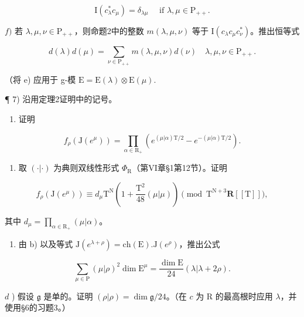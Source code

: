 \[
\mathrm{I} (c _ {\lambda} ^ {*} c _ {\mu}) = \delta_ {\lambda \mu} \quad \text { if } \lambda , \mu \in \mathrm{P} _ {+ +}.
\]

\(f)\) 若 \(\lambda, \mu, \nu \in \mathrm{P}_{++}\)，则命题2中的整数 \(m(\lambda, \mu, \nu)\) 等于 \(\mathrm{I}(c_{\lambda} c_{\mu} c_{\nu}^{*})\)。推出恒等式

\[
d (\lambda) d (\mu) = \sum_ {\nu \in \mathrm{P} _ {+ +}} m (\lambda , \mu , \nu) d (\nu) \quad \lambda , \mu , \nu \in \mathrm{P} _ {+ +}.
\]

（将 e) 应用于 g-模 \(\mathrm{E} = \mathrm{E}(\lambda) \otimes \mathrm{E}(\mu).\)

¶ 7) 沿用定理2证明中的记号。

\begin{enumerate}
\def\labelenumi{\alph{enumi})}
\tightlist
\item
  证明
\end{enumerate}

\[
f _ {\rho} (\mathrm{J} (e ^ {\mu})) = \prod_ {\alpha \in \mathrm{R} _ {+}} (e ^ {(\mu | \alpha) \mathrm{T} / 2} - e ^ {- (\mu | \alpha) \mathrm{T} / 2}).
\]

\begin{enumerate}
\def\labelenumi{\alph{enumi})}
\setcounter{enumi}{1}
\tightlist
\item
  取 \((\cdot |\cdot)\) 为典则双线性形式 \(\varPhi_{\mathrm{R}}\)（第VI章§1第12节）。证明
\end{enumerate}

\[
  f _ {\rho} (\mathrm{J} (e ^ {\mu})) \equiv d _ {\mu} \mathrm{T} ^ {\mathrm{N}} \left(1 + \frac {\mathrm{T} ^ {2}}{48} (\mu | \mu)\right) \pmod {\mathrm{T} ^ {\mathrm{N} + 3} \mathbf {R} [ [ \mathrm{T} ] ]},
\]

其中 \(d_{\mu} = \prod_{\alpha \in \mathrm{R}_{+}}(\mu |\alpha)\)。

\begin{enumerate}
\def\labelenumi{\alph{enumi})}
\setcounter{enumi}{2}
\tightlist
\item
  由 b) 以及等式 \(\mathrm{J}(e^{\lambda+\rho})=\mathrm{ch}(\mathrm{E}).\mathrm{J}(e^{\rho})\)，推出公式
\end{enumerate}

\[
  \sum_ {\mu \in \mathrm{P}} (\mu | \rho) ^ {2} \dim \mathrm{E} ^ {\mu} = \frac {\dim \mathrm{E}}{24} (\lambda | \lambda + 2 \rho).
\]

\(d\) ) 假设 \(\mathfrak{g}\) 是单的。证明 \((\rho |\rho) = \dim \mathfrak{g} / 24\)。（在 \(c\) 为 R 的最高根时应用 \(\lambda\)，并使用§6的习题3。）

